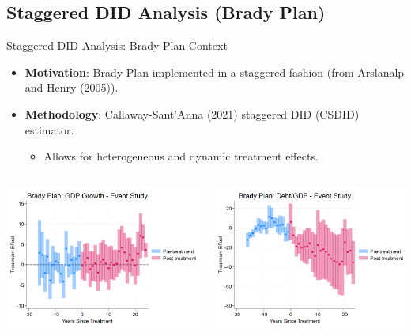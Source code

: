 \documentclass{beamer}
\begin{document}
\subsection{Staggered DID Analysis (Brady Plan)}
\begin{frame}{Staggered DID Analysis: Brady Plan Context}
  \begin{itemize}
    \item \textbf{Motivation}: Brady Plan implemented in a staggered fashion (from Arslanalp and Henry (2005)).
    \item \textbf{Methodology}: Callaway-Sant'Anna (2021) staggered DID (CSDID) estimator.
    \begin{itemize}
        \item Allows for heterogeneous and dynamic treatment effects.
    \end{itemize}
  \end{itemize}
  \begin{columns}
    \begin{column}{0.5\textwidth}
      \centering
      \includegraphics[width=0.9\linewidth]{figures/CS_Brady_Growth_EventStudy.png}
    \end{column}
    \begin{column}{0.5\textwidth}
      \centering
      \includegraphics[width=0.9\linewidth]{figures/CS_Brady_Debt_EventStudy.png}
    \end{column}
  \end{columns}
\end{frame}
\end{document}
